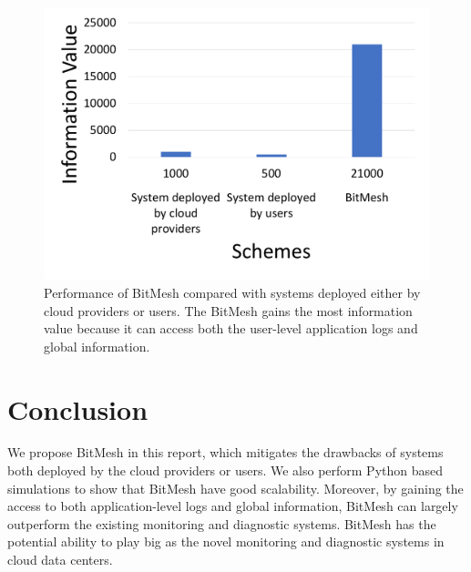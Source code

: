 \documentclass[11px]{article}
\newcommand{\projTitle}{BitMesh\xspace}
\begin{document}
\label{ssec:eval_performance}
\begin{figure}[h]
\label{fig:performance}
\center
\includegraphics[width=0.6\linewidth]{figures/peformance.pdf}
\caption{Performance of \projTitle compared with systems deployed either by cloud providers or users. The \projTitle gains the most information value because it can access both the user-level application logs and global information.}
\label{fig:miner_work_flow}
\end{figure}

\section{Conclusion}
We propose \projTitle in this report, which mitigates the drawbacks of systems both deployed by the cloud providers or users. We also perform Python based simulations to show that \projTitle have good scalability. Moreover, by gaining the access to both application-level logs and global information, \projTitle can largely outperform the existing monitoring and diagnostic systems. \projTitle has the potential ability to play big as the novel monitoring and diagnostic systems in cloud data centers.

\newpage


\end{document}
